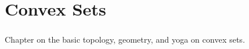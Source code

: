 \chapter{Convex Sets}
\label{chap:01}

\paragraph{}Chapter on the basic topology, geometry, and yoga on convex sets.









